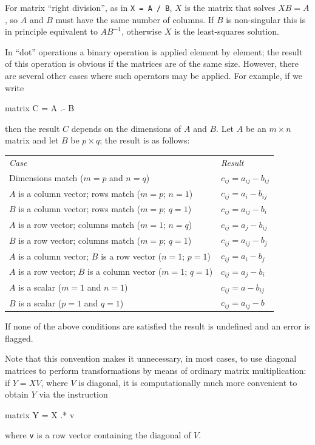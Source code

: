 For matrix ``right division'', as in \texttt{X = A / B}, $X$ is the
matrix that solves $XB = A$, so $A$ and $B$ must have the same number
of columns. If $B$ is non-singular this is in principle equivalent to
$AB^{-1}$, otherwise $X$ is the least-squares solution.

In ``dot'' operations a binary operation is applied element by
element; the result of this operation is obvious if the matrices are
of the same size. However, there are several other cases where such
operators may be applied.  For example, if we write
%
\begin{code}
matrix C = A .- B
\end{code}
% 
then the result $C$ depends on the dimensions of $A$ and $B$.  Let $A$
be an $m \times n$ matrix and let $B$ be $p \times q$; the result is
as follows:
\begin{center}
  \begin{tabular}{ll}
    \textit{Case} & \textit{Result} \\[4pt]
    Dimensions match ($m=p$ and $n=q$) & 
    $c_{ij} = a_{ij} -  b_{ij}$ \\ 
    $A$ is a column vector; rows match ($m=p$; $n=1$) &
    $c_{ij} = a_{i} - b_{ij}$ \\ 
    $B$ is a column vector; rows match ($m=p$; $q=1$) &
    $c_{ij} = a_{ij} - b_{i}$ \\ 
    $A$ is a row vector; columns match ($m=1$; $n=q$) &
    $c_{ij} = a_{j} - b_{ij}$ \\ 
    $B$ is a row vector; columns match ($m=p$; $q=1$) &
    $c_{ij} = a_{ij} - b_{j}$ \\ 
    $A$ is a column vector; $B$ is a row vector ($n=1$; $p=1$) &
    $c_{ij} = a_{i} - b_{j}$ \\ 
    $A$ is a row vector; $B$ is a column vector ($m=1$; $q=1$) &
    $c_{ij} = a_{j} - b_{i}$ \\ 
    $A$ is a scalar ($m=1$ and $n=1$) &
    $c_{ij} = a - b_{ij}$ \\ 
    $B$ is a scalar ($p=1$ and $q=1$) &
    $c_{ij} = a_{ij} - b$ \\ 
  \end{tabular}
\end{center}
%
If none of the above conditions are satisfied the result is undefined
and an error is flagged.

Note that this convention makes it unnecessary, in most cases, to use
diagonal matrices to perform transformations by means of ordinary
matrix multiplication: if $Y = XV$, where $V$ is diagonal, it is
computationally much more convenient to obtain $Y$ via the instruction
%
\begin{code}
matrix Y = X .* v
\end{code}
%
where \texttt{v} is a row vector containing the diagonal of $V$.

